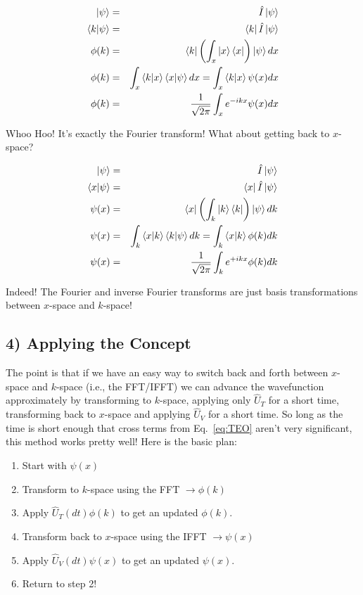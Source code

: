 \documentclass[11pt]{article} %
\begin{document}
\begin{eqnarray}
\ket{\psi}       &=& \hat{I}\ket{\psi}\\
\braket{k|\psi}   &=& \bra{k}\hat{I}\ket{\psi}\\
\phi(k)          &=& \bra{k}\left(\int_x \ket{x}\bra{x}\right)\ket{\psi} dx\\
\phi(k)          &=& \int_x \braket{k|x}\braket{x|\psi} dx = \int_x \braket{k|x} \psi(x) dx\\
\phi(k)          &=& \frac{1}{\sqrt{2\pi}} \int_x e^{-ikx} \psi(x) dx
\end{eqnarray}

Whoo Hoo! It's exactly the Fourier transform! What about getting back to $x$-space?

\begin{eqnarray}
\ket{\psi}       &=& \hat{I}\ket{\psi}\\
\braket{x|\psi}  &=& \bra{x}\hat{I}\ket{\psi}\\
\psi(x)          &=& \bra{x}\left(\int_k \ket{k}\bra{k}\right)\ket{\psi} dk\\
\psi(x)          &=& \int_k \braket{x|k}\braket{k|\psi} dk = \int_k \braket{x|k} \phi(k) dk\\
\psi(x)          &=& \frac{1}{\sqrt{2\pi}} \int_k e^{+ikx} \phi(k) dk
\end{eqnarray}

Indeed! The Fourier and inverse Fourier transforms are just basis transformations between $x$-space and $k$-space! 

\subsection*{4) Applying the Concept}

The point is that if we have an easy way to switch back and forth between $x$-space and $k$-space (i.e., the FFT/IFFT) we can advance the wavefunction approximately by  transforming to $k$-space, applying only $\hat{U}_T$ for a short time, transforming back to $x$-space and applying $\hat{U}_V$ for a short time. So long as the time is short enough that cross terms from Eq.~\ref{eq:TEO} aren't very significant, this method works pretty well! Here is the basic plan:

\begin{enumerate}
\item Start with $\psi(x)$
\item Transform to $k$-space using the FFT $\rightarrow \phi(k)$
\item Apply $\hat{U}_T(dt) \phi(k)$ to get an updated $\phi(k)$.
\item Transform back to $x$-space using the IFFT $\rightarrow \psi(x)$
\item Apply $\hat{U}_V(dt) \psi(x)$ to get an updated $\psi(x)$.
\item Return to step 2!
\end{enumerate}
\end{document}
